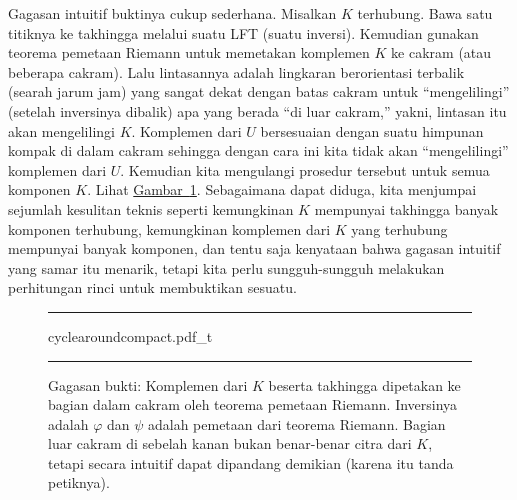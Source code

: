 \documentclass[12pt,openany]{book}
\newcommand{\myquote}[1]{``#1''}
\theoremstyle{plain}
\theoremstyle{remark}
\theoremstyle{definition}
\newenvironment{myfig}{%
\begin{figure}[h!t]
\noindent\rule{\textwidth}{0.5pt}\vspace{12pt}\par\centering}%
{\par\noindent\rule{\textwidth}{0.5pt}
\end{figure}}
\theoremstyle{exercise}
\theoremstyle{example}
\newcommand{\figureref}[1]{\hyperref[#1]{Gambar~\ref*{#1}}}
\begin{document}
Gagasan intuitif buktinya cukup sederhana. Misalkan $K$
terhubung.
Bawa satu titiknya ke takhingga melalui suatu LFT
(suatu inversi).
Kemudian gunakan teorema pemetaan Riemann untuk memetakan komplemen $K$ ke
cakram (atau beberapa cakram).
Lalu lintasannya adalah lingkaran berorientasi terbalik (searah jarum jam) yang sangat dekat dengan batas cakram
untuk \myquote{mengelilingi} (setelah inversinya dibalik) apa yang berada
\myquote{di luar cakram,} yakni, lintasan itu akan mengelilingi $K$.
Komplemen dari $U$
bersesuaian dengan suatu himpunan kompak di dalam cakram sehingga dengan cara ini kita tidak akan
\myquote{mengelilingi} komplemen dari $U$.
Kemudian kita mengulangi prosedur tersebut untuk semua komponen $K$. Lihat
\figureref{fig:cyclearoundcompact}. Sebagaimana dapat diduga,
kita menjumpai sejumlah kesulitan teknis seperti kemungkinan $K$ mempunyai
takhingga banyak komponen terhubung, kemungkinan komplemen dari $K$ yang terhubung mempunyai banyak komponen,
dan tentu saja kenyataan bahwa gagasan intuitif yang samar itu menarik,
tetapi kita perlu sungguh-sungguh melakukan perhitungan rinci untuk membuktikan sesuatu.

\begin{myfig}
{cyclearoundcompact.pdf_t}
\caption{Gagasan bukti: Komplemen dari $K$ beserta takhingga dipetakan ke
bagian dalam cakram oleh teorema pemetaan Riemann. Inversinya adalah
$\varphi$ dan $\psi$ adalah pemetaan dari teorema Riemann.
Bagian luar cakram di sebelah kanan bukan benar-benar citra dari $K$, tetapi
secara intuitif dapat dipandang demikian (karena itu tanda petiknya).\label{fig:cyclearoundcompact}}
\end{myfig}
\end{document}
